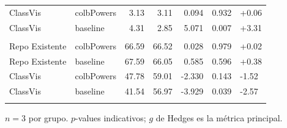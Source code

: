 \begin{table}[ht]
\begin{tabular}{llrrrrl}
    \quad ClassVis & colbPowers & 3.13 & 3.11 & 0.094 & 0.932 & +0.06 \\
    \quad ClassVis & baseline & 4.31 & 2.85 & 5.071 & 0.007 & +3.31 \\
    \addlinespace
    \multicolumn{7}{l}{\textit{Maintainability index}} \\
    \quad Repo Existente & colbPowers & 66.59 & 66.52 & 0.028 & 0.979 & +0.02 \\
    \quad Repo Existente & baseline & 67.59 & 66.05 & 0.585 & 0.596 & +0.38 \\
    \quad ClassVis & colbPowers & 47.78 & 59.01 & -2.330 & 0.143 & -1.52 \\
    \quad ClassVis & baseline & 41.54 & 56.97 & -3.929 & 0.039 & -2.57 \\
    \addlinespace
    \bottomrule
  \end{tabular}
  \begin{tablenotes}
    \small \item $n=3$ por grupo. $p$-values indicativos; $g$ de Hedges es la métrica principal.
  \end{tablenotes}
\end{table}